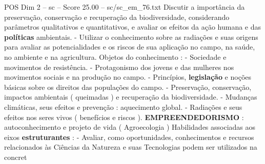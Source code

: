 \begin{textsample}{POS Dim 2 – sc – Score 25.00 – sc/sc\_em\_76.txt}
Discutir a importância da preservação, conservação e recuperação da biodiversidade, considerando parâmetros qualitativos e quantitativos, e avaliar os efeitos da ação humana e das \textbf{políticas} ambientais. - Utilizar o conhecimento sobre as radiações e suas origens para avaliar as potencialidades e os riscos de sua aplicação no campo, na saúde, no ambiente e na agricultura.
Objetos do conhecimento : - Sociedade e movimentos de resistência. - Protagonismo dos jovens e das mulheres nos movimentos sociais e na produção no campo. - Princípios, \textbf{legislação} e noções básicas sobre os direitos das populações do campo. - Preservação, conservação, impactos ambientais ( queimadas ) e recuperação da biodiversidade. - Mudanças climáticas, seus efeitos e prevenção : aquecimento global. - Radiações e seus efeitos nos seres vivos ( benefícios e riscos ). \textbf{EMPREENDEDORISMO} : autoconhecimento e projeto de vida ( Agroecologia ) Habilidades associadas aos eixos \textbf{estruturantes} : - Avaliar, como oportunidades, conhecimentos e recursos relacionados às Ciências da Natureza e suas Tecnologias podem ser utilizados na concret

\end{textsample}
